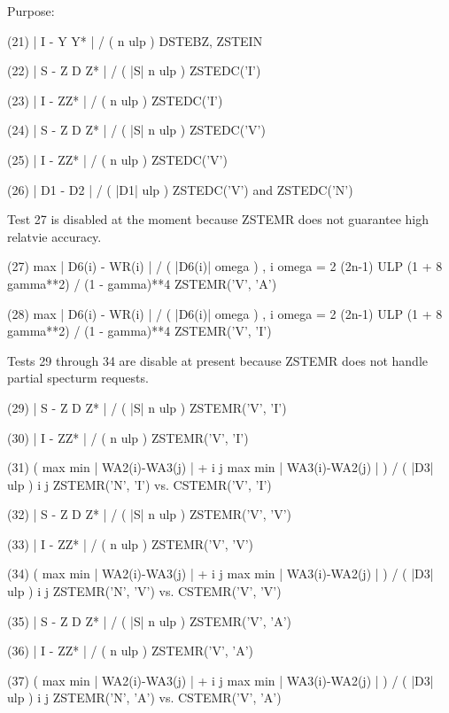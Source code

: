 \begin{DoxyParagraph}{Purpose\+: }
\begin{DoxyVerb}
 (21)    | I - Y Y* | / ( n ulp )          DSTEBZ, ZSTEIN

 (22)    | S - Z D Z* | / ( |S| n ulp )    ZSTEDC('I')

 (23)    | I - ZZ* | / ( n ulp )           ZSTEDC('I')

 (24)    | S - Z D Z* | / ( |S| n ulp )    ZSTEDC('V')

 (25)    | I - ZZ* | / ( n ulp )           ZSTEDC('V')

 (26)    | D1 - D2 | / ( |D1| ulp )           ZSTEDC('V') and
                                              ZSTEDC('N')

 Test 27 is disabled at the moment because ZSTEMR does not
 guarantee high relatvie accuracy.

 (27)    max | D6(i) - WR(i) | / ( |D6(i)| omega ) ,
          i
         omega = 2 (2n-1) ULP (1 + 8 gamma**2) / (1 - gamma)**4
                                              ZSTEMR('V', 'A')

 (28)    max | D6(i) - WR(i) | / ( |D6(i)| omega ) ,
          i
         omega = 2 (2n-1) ULP (1 + 8 gamma**2) / (1 - gamma)**4
                                              ZSTEMR('V', 'I')

 Tests 29 through 34 are disable at present because ZSTEMR
 does not handle partial specturm requests.

 (29)    | S - Z D Z* | / ( |S| n ulp )    ZSTEMR('V', 'I')

 (30)    | I - ZZ* | / ( n ulp )           ZSTEMR('V', 'I')

 (31)    ( max { min | WA2(i)-WA3(j) | } +
            i     j
           max { min | WA3(i)-WA2(j) | } ) / ( |D3| ulp )
            i     j
         ZSTEMR('N', 'I') vs. CSTEMR('V', 'I')

 (32)    | S - Z D Z* | / ( |S| n ulp )    ZSTEMR('V', 'V')

 (33)    | I - ZZ* | / ( n ulp )           ZSTEMR('V', 'V')

 (34)    ( max { min | WA2(i)-WA3(j) | } +
            i     j
           max { min | WA3(i)-WA2(j) | } ) / ( |D3| ulp )
            i     j
         ZSTEMR('N', 'V') vs. CSTEMR('V', 'V')

 (35)    | S - Z D Z* | / ( |S| n ulp )    ZSTEMR('V', 'A')

 (36)    | I - ZZ* | / ( n ulp )           ZSTEMR('V', 'A')

 (37)    ( max { min | WA2(i)-WA3(j) | } +
            i     j
           max { min | WA3(i)-WA2(j) | } ) / ( |D3| ulp )
            i     j
         ZSTEMR('N', 'A') vs. CSTEMR('V', 'A')


\end{DoxyVerb}
\end{DoxyParagraph}
